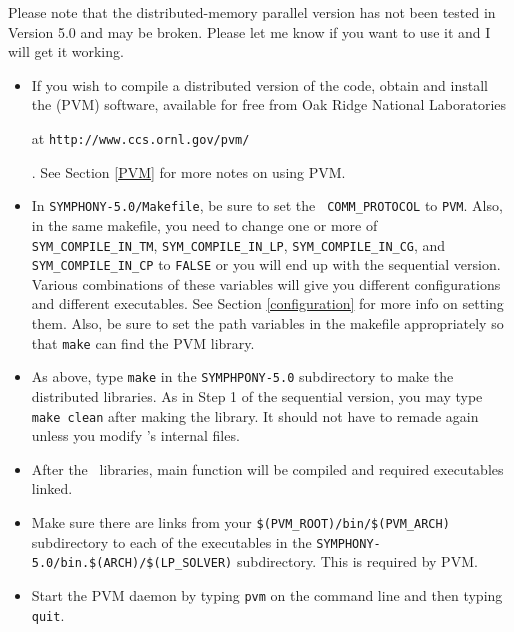 Please note that the distributed-memory parallel version has not been tested
in Version 5.0 and may be broken. Please let me know if you want to use it and
I will get it working.

\begin{itemize}
        \item If you wish to compile a distributed version of the code, obtain
and install the {\em {}} (PVM) software, available for free
from Oak Ridge National Laboratories
\begin{latexonly}
        at {\tt http://www.ccs.ornl.gov/pvm/}
\end{latexonly}. 
        See Section \ref{PVM} for more notes on using PVM.
        
        \item In \texttt{SYMPHONY-5.0/Makefile}, be sure to set the {\tt
        COMM\_PROTOCOL} to {\tt PVM}. Also, in
        the same makefile, you need to change one or more of {\tt
        SYM\_COMPILE\_IN\_TM}, {\tt SYM\_COMPILE\_IN\_LP}, 
	{\tt SYM\_COMPILE\_IN\_CG}, and
        {\tt SYM\_COMPILE\_IN\_CP} to {\tt FALSE} or you will end up with the
        sequential version. Various combinations of these variables will give
        you different configurations and different executables. See Section
        \ref{configuration} for more info on setting them. Also, be sure to
        set the path variables in the makefile appropriately so that 
	\texttt{make} can find the PVM library.

        \item As above, type {\tt  make} in the \texttt{SYMPHPONY-5.0} 
	subdirectory to
        make the distributed libraries. As in Step 1 of the sequential
        version, you may type {\tt  make clean} after making the
        library. It should not have to remade again unless you modify
        \BB's internal files.

        \item After the \BB\ libraries, main function will be compiled and
        required executables linked.

        \item Make sure there are links from your
        \texttt{\$(PVM\_ROOT)/bin/\$(PVM\_ARCH)} subdirectory to each of the
        executables in the
        \texttt{SYMPHONY-5.0/bin.\$(ARCH)/\$(LP\_SOLVER)} subdirectory. 
	This is required by PVM.

        \item Start the PVM daemon by typing {\tt  pvm} on the command line
        and then typing {\tt  quit}.


\end{itemize}
